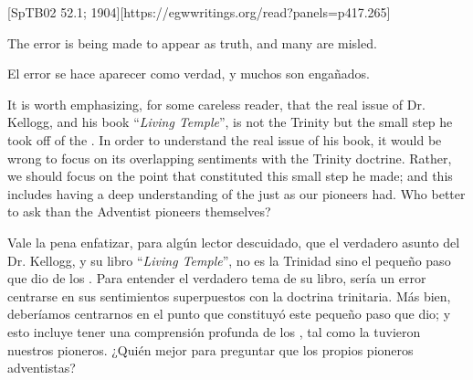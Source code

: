 [SpTB02 52.1; 1904][https://egwwritings.org/read?panels=p417.265]


The error is being made to appear as truth, and many are misled.


El error se hace aparecer como verdad, y muchos son engañados.


It is worth emphasizing, for some careless reader, that the real issue of Dr. Kellogg, and his book “\textit{Living Temple}”, is not the Trinity but the small step he took off of the . In order to understand the real issue of his book, it would be wrong to focus on its overlapping sentiments with the Trinity doctrine. Rather, we should focus on the point that constituted this small step he made; and this includes having a deep understanding of the  just as our pioneers had. Who better to ask than the Adventist pioneers themselves?


Vale la pena enfatizar, para algún lector descuidado, que el verdadero asunto del Dr. Kellogg, y su libro “\textit{Living Temple}”, no es la Trinidad sino el pequeño paso que dio de los . Para entender el verdadero tema de su libro, sería un error centrarse en sus sentimientos superpuestos con la doctrina trinitaria. Más bien, deberíamos centrarnos en el punto que constituyó este pequeño paso que dio; y esto incluye tener una comprensión profunda de los , tal como la tuvieron nuestros pioneros. ¿Quién mejor para preguntar que los propios pioneros adventistas?





% 
